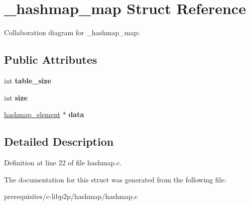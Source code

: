 \hypertarget{struct__hashmap__map}{}\section{\+\_\+hashmap\+\_\+map Struct Reference}
\label{struct__hashmap__map}


Collaboration diagram for \+\_\+hashmap\+\_\+map\+:
\subsection*{Public Attributes}
\begin{DoxyCompactItemize}
\item 
\mbox{\label{struct__hashmap__map_aec0dc0ceb515f1a28a3c4ad33ec08c57}} 
int {\bfseries table\+\_\+size}
\item 
\mbox{\label{struct__hashmap__map_a2a4c10445e6345c9b335365186752e9e}} 
int {\bfseries size}
\item 
\mbox{\label{struct__hashmap__map_a64bbd3edeb18ac57a1056fccbc836419}} 
\mbox{\hyperlink{struct__hashmap__element}{hashmap\+\_\+element}} $\ast$ {\bfseries data}
\end{DoxyCompactItemize}


\subsection{Detailed Description}


Definition at line 22 of file hashmap.\+c.



The documentation for this struct was generated from the following file\+:\begin{DoxyCompactItemize}
\item 
prerequisites/c-\/libp2p/hashmap/hashmap.\+c\end{DoxyCompactItemize}
